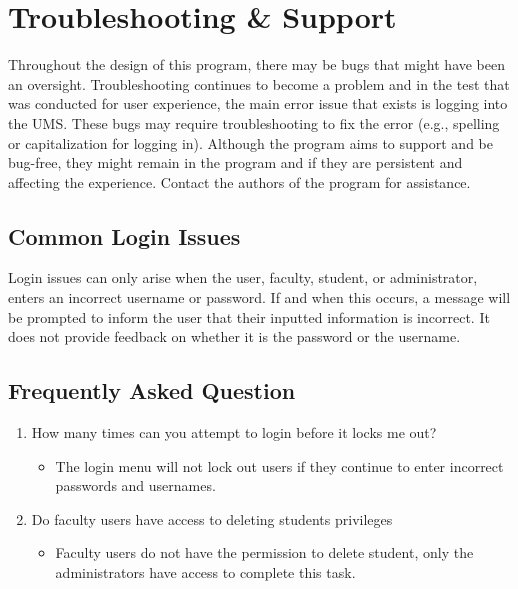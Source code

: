 \newpage
\section{Troubleshooting \& Support}

Throughout the design of this program, there may be bugs that might have been an oversight. Troubleshooting continues to become a problem and in the test that was conducted for user experience, the main error issue that exists is logging into the UMS.  These bugs may require troubleshooting to fix the error (e.g., spelling or capitalization for logging in). Although the program aims to support and be bug-free, they might remain in the program and if they are persistent and affecting the experience. Contact the authors of the program for assistance.



\subsection{Common Login Issues}
Login issues can only arise when the user, faculty, student, or administrator, enters an incorrect username or password. If and when this occurs, a message will be prompted to inform the user that their inputted information is incorrect. It does not provide feedback on whether it is the password or the username.


\subsection{Frequently Asked Question}
\begin{enumerate}
    \item How many times can you attempt to login before it locks me out?
    \begin{itemize}
        \item The login menu will not lock out users if they continue to enter incorrect passwords and usernames.
    \end{itemize}
    \item Do faculty users have access to deleting students privileges
    \begin{itemize}
        \item Faculty users do not have the permission to delete student, only the administrators have access to complete this task.
    \end{itemize}
\end{enumerate}

